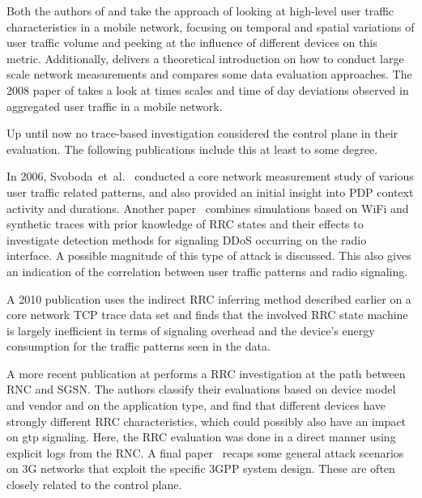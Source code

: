 Both the authors of \cite{shafiq2011characterizing} and \cite{paul2011understanding} take the approach of looking at high-level user traffic characteristics in a mobile network, focusing on temporal and spatial variations of user traffic volume and peeking at the influence of different devices on this metric. Additionally, \cite{baer2011two} delivers a theoretical introduction on how to conduct large scale network measurements and compares some data evaluation approaches. The 2008 paper of \cite{4570772} takes a look at times scales and time of day deviations observed in aggregated user traffic in a mobile network.

Up until now no trace-based investigation considered the control plane in their evaluation. The following publications include this at least to some degree.

In 2006, Svoboda~et~al.~\cite{svoboda2006composition} conducted a core network measurement study of various user traffic related patterns, and also provided an initial insight into \gls{PDP} context activity and durations. Another paper~\cite{lee2007detection} combines simulations based on WiFi and synthetic traces with prior knowledge of \gls{RRC} states and their effects to investigate detection methods for signaling \gls{DDoS} occurring on the radio interface. A possible magnitude of this type of attack is discussed. This also gives an indication of the correlation between user traffic patterns and radio signaling.

A 2010 publication\cite{Qian:2010:CRR:1879141.1879159} uses the indirect \gls{RRC} inferring method described earlier on a core network \gls{TCP} trace data set and finds that the involved \gls{RRC} state machine is largely inefficient in terms of signaling overhead and the device's energy consumption for the traffic patterns seen in the data. 

A more recent publication at \cite{he2012panoramic} performs a \gls{RRC} investigation at the path between \gls{RNC} and \gls{SGSN}. The authors classify their evaluations based on device model and vendor and on the application type, and find that different devices have strongly different \gls{RRC} characteristics, which could possibly also have an impact on \gls{gtp} signaling. Here, the \gls{RRC} evaluation was done in a direct manner using explicit logs from the \gls{RNC}. A final paper~\cite{Ricciato2010551} recaps some general attack scenarios on \gls{3G} networks that exploit the specific \gls{3GPP} system design. These are often closely related to the control plane.


